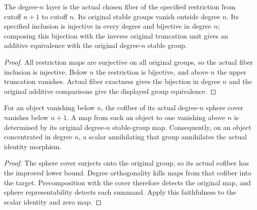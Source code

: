 \begin{proposition}
  \label{prop:actual-postnikov-layers}
  \leanok
  The degree-$n$ layer is the actual chosen fiber of the specified restriction from cutoff $n+1$ to cutoff $n$. Its original stable groups vanish outside degree $n$. Its specified inclusion is injective in every degree and bijective in degree $n$; composing this bijection with the inverse original truncation unit gives an additive equivalence with the original degree-$n$ stable group.
\end{proposition}
\begin{proof}
  All restriction maps are surjective on all original groups, so the actual fiber inclusion is injective. Below $n$ the restriction is bijective, and above $n$ the upper truncation vanishes. Actual fiber exactness gives the bijection in degree $n$ and the original additive comparisons give the displayed group equivalence.
  \leanok
\end{proof}

\begin{proposition}
  \label{prop:actual-postnikov-map-detection}
  \leanok
  For an object vanishing below $n$, the cofiber of its actual degree-$n$ sphere cover vanishes below $n+1$. A map from such an object to one vanishing above $n$ is determined by its original degree-$n$ stable-group map. Consequently, on an object concentrated in degree $n$, a scalar annihilating that group annihilates the actual identity morphism.
\end{proposition}
\begin{proof}
  The sphere cover surjects onto the original group, so its actual cofiber has the improved lower bound. Degree orthogonality kills maps from that cofiber into the target. Precomposition with the cover therefore detects the original map, and sphere representability detects each summand. Apply this faithfulness to the scalar identity and zero map.
  \leanok
\end{proof}

